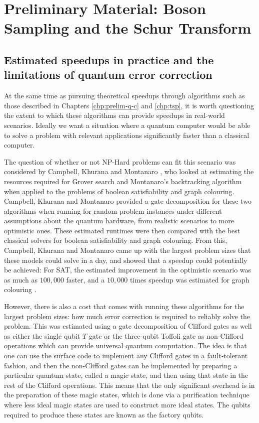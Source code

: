 \chapter{Preliminary Material: Boson Sampling and the Schur Transform}

\section{Estimated speedups in practice and the limitations of quantum error correction}

At the same time as pursuing theoretical speedups through algorithms such as those described in Chapters \ref{chp:prelim-q-c} and \ref{chp:tsp}, it is worth questioning the extent to which these algorithms can provide speedups in real-world scenarios. Ideally we want a situation where a quantum computer would be able to solve a problem with relevant applications significantly faster than a classical computer.

The question of whether or not NP-Hard problems can fit this scenario was considered by Campbell, Khurana and Montanaro \cite{campbell2019}, who looked at estimating the resources required for Grover search and Montanaro's backtracking algorithm when applied to the problems of boolean satisfiability and graph colouring. Campbell, Khurana and Montanaro provided a gate decomposition for these two algorithms when running for random problem instances under different assumptions about the quantum hardware, from realistic scenarios to more optimistic ones. These estimated runtimes were then compared with the best classical solvers for boolean satisfiability and graph colouring. From this, Campbell, Khurana and Montanaro came up with the largest problem sizes that these models could solve in a day, and showed that a speedup could potentially be achieved: For SAT, the estimated improvement in the optimistic scenario was as much as $100,000$ faster, and a $10,000$ times speedup was estimated for graph colouring \cite{campbell2019}.

However, there is also a cost that comes with running these algorithms for the largest problem sizes: how much error correction is required to reliably solve the problem. This was estimated using a gate decomposition of Clifford gates as well as either the single qubit $T$ gate or the three-qubit Toffoli gate as non-Clifford operations which can provide universal quantum computation. The idea is that one can use the surface code to implement any Clifford gates in a fault-tolerant fashion, and then the non-Clifford gates can be implemented by preparing a particular quantum state, called a magic state, and then using that state in the rest of the Clifford operations. This means that the only significant overhead is in the preparation of these magic states, which is done via a purification technique where less ideal magic states are used to construct more ideal states. The qubits required to produce these states are known as the factory qubits.


